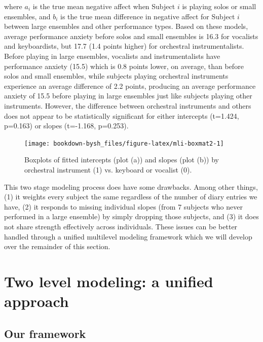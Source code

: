 \documentclass[
]{krantz}
\begin{document}
where \(a_{i}\) is the true mean negative affect when Subject \(i\) is playing solos or small ensembles, and \(b_{i}\) is the true mean difference in negative affect for Subject \(i\) between large ensembles and other performance types. Based on these models, average performance anxiety before solos and small ensembles is 16.3 for vocalists and keyboardists, but 17.7 (1.4 points higher) for orchestral instrumentalists. Before playing in large ensembles, vocalists and instrumentalists have performance anxiety (15.5) which is 0.8 points lower, on average, than before solos and small ensembles, while subjects playing orchestral instruments experience an average difference of 2.2 points, producing an average performance anxiety of 15.5 before playing in large ensembles just like subjects playing other instruments. However, the difference between orchestral instruments and others does not appear to be statistically significant for either intercepts (t=1.424, p=0.163) or slopes (t=-1.168, p=0.253).

\begin{figure}

{\centering \texttt{[image: bookdown-bysh\_files/figure-latex/mli-boxmat2-1]} 

}

\caption{Boxplots of fitted intercepts (plot (a)) and slopes (plot (b)) by orchestral instrument (1) vs. keyboard or vocalist (0).}\label{fig:mli-boxmat2}
\end{figure}

This two stage modeling process does have some drawbacks. Among other things, (1) it weights every subject the same regardless of the number of diary entries we have, (2) it responds to missing individual slopes (from 7 subjects who never performed in a large ensemble) by simply dropping those subjects, and (3) it does not share strength effectively across individuals. These issues can be better handled through a unified multilevel modeling framework which we will develop over the remainder of this section.

\hypertarget{twolevelmodelingunified}{%
\section{Two level modeling: a unified approach}\label{twolevelmodelingunified}}

\hypertarget{ourframework}{%
\subsection{Our framework}\label{ourframework}}
\end{document}
